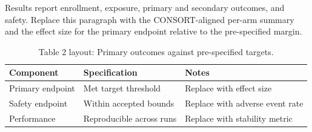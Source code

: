 
Results report enrollment, exposure, primary and secondary outcomes, and safety. Replace this paragraph with the CONSORT-aligned per-arm summary and the effect size for the primary endpoint relative to the pre-specified margin.

\begin{table}[H]
\caption{Table 2 layout: Primary outcomes against pre-specified targets.}
\label{tab:results_primary}
\centering
\begin{tabular}{>{\raggedright\arraybackslash}p{3.4cm} >{\raggedright\arraybackslash}p{4.6cm} >{\raggedright\arraybackslash}p{5.4cm}}
\toprule
\textbf{Component} & \textbf{Specification} & \textbf{Notes} \\
\midrule
  Primary endpoint & Met target threshold & Replace with effect size \\
  Safety endpoint & Within accepted bounds & Replace with adverse event rate \\
  Performance & Reproducible across runs & Replace with stability metric \\
\bottomrule
\end{tabular}
\end{table}
